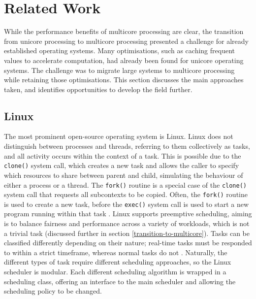 \documentclass[bsc,frontabs,singlespacing,parskip,deptreport]{infthesis}
\begin{document}




\section{Related Work} \label{related-work}
While the performance benefits of multicore processing are clear, the transition from unicore processing to multicore processing presented a challenge for already established operating systems. Many optimisations, such as caching frequent values to accelerate computation, had already been found for unicore operating systems. The challenge was to migrate large systems to multicore processing while retaining those optimisations. This section discusses the main approaches taken, and identifies opportunities to develop the field further.

\subsection{Linux}
The most prominent open-source operating system is Linux. Linux does not distinguish between processes and threads, referring to them collectively as tasks, and all activity occurs within the context of a task. This is possible due to the \verb|clone()| system call, which creates a new task and allows the caller to specify which resources to share between parent and child, simulating the behaviour of either a process or a thread. The \verb|fork()| routine is a special case of the \verb|clone()| system call that requests all subcontexts to be copied. Often, the \verb|fork()| routine is used to create a new task, before the \verb|exec()| system call is used to start a new program running within that task \cite{silberschatz}. Linux supports preemptive scheduling, aiming is to balance fairness and performance across a variety of workloads, which is not a trivial task (discussed further in section \ref{transition-to-multicore}). Tasks can be classified differently depending on their nature; real-time tasks must be responded to within a strict timeframe, whereas normal tasks do not \cite{seeker}. Naturally, the different types of task require different scheduling approaches, so the Linux scheduler is modular. Each different scheduling algorithm is wrapped in a scheduling class, offering an interface to the main scheduler \cite{seeker} and allowing the scheduling policy to be changed. 
\end{document}
